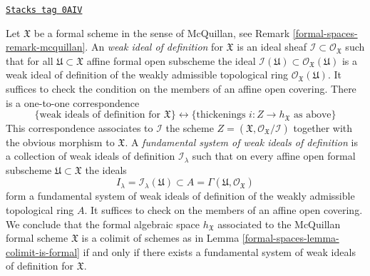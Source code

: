 \begin{remark}

\label{formal-spaces-remark-weak-ideals-of-definition}
\href{https://stacks.math.columbia.edu/tag/0AIV}{\texttt{Stacks tag 0AIV}}

Let $\mathfrak X$ be a formal scheme in the sense of McQuillan, see
Remark \ref{formal-spaces-remark-mcquillan}. An {\it weak ideal of definition}
for $\mathfrak X$ is an ideal sheaf
$\mathcal{I} \subset \mathcal{O}_\mathfrak X$ such that
for all $\mathfrak U \subset \mathfrak X$ affine formal open subscheme
the ideal
$\mathcal{I}(\mathfrak U) \subset \mathcal{O}_\mathfrak X(\mathfrak U)$
is a weak ideal of definition of the weakly admissible topological ring
$\mathcal{O}_\mathfrak X(\mathfrak U)$.
It suffices to check the condition on the members of an affine open covering.
There is a one-to-one correspondence
$$
\{\text{weak ideals of definition for }\mathfrak X\}
\leftrightarrow
\{\text{thickenings }i : Z \to h_\mathfrak X\text{ as above}\}
$$
This correspondence associates to $\mathcal{I}$ the scheme
$Z = (\mathfrak X, \mathcal{O}_\mathfrak X/\mathcal{I})$
together with the obvious morphism to $\mathfrak X$.
A {\it fundamental system of weak ideals of definition}
is a collection of weak ideals of definition
$\mathcal{I}_\lambda$ such that on every affine open
formal subscheme $\mathfrak U \subset \mathfrak X$ the
ideals
$$
I_\lambda = \mathcal{I}_\lambda(\mathfrak U) \subset
A = \Gamma(\mathfrak U, \mathcal{O}_\mathfrak X)
$$
form a fundamental system of weak ideals of definition of the
weakly admissible topological ring $A$. It suffices to check
on the members of an affine open covering. We conclude that
the formal algebraic space $h_\mathfrak X$ associated to
the McQuillan formal scheme $\mathfrak X$ is a colimit of schemes as
in Lemma \ref{formal-spaces-lemma-colimit-is-formal} if and only if
there exists a fundamental system of weak ideals of definition
for $\mathfrak X$.
\end{remark}

